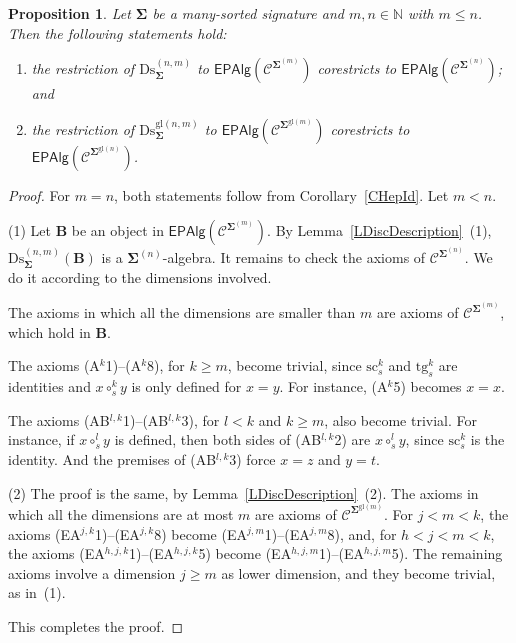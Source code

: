 \documentclass[a4paper, reqno
]{amsart}
\newcommand{\sig}[1]{\mathbf{#1}}             %
\newcommand{\spec}[1]{\boldsymbol{\mathcal{#1}}} %
\newcommand{\gl}{\mathrm{gl}}                %
\newcommand{\src}{\mathrm{sc}}
\newcommand{\tgt}{\mathrm{tg}}
\newcommand{\Ds}{\mathrm{Ds}}
\theoremstyle{plain}
\newtheorem{proposition}[theorem]{Proposition}
\theoremstyle{definition}
\begin{document}
\begin{proposition}\label{PDiscDerivor}
Let $\sig{\Sigma}$ be a many-sorted signature and $m,n\in\mathbb{N}$ with $m\leq n$.
Then the following statements hold:
\begin{enumerate}
\item the restriction of $\Ds^{(n,m)}_{\sig{\Sigma}}$ to $\mathsf{EPAlg}(\spec{C}^{\sig{\Sigma}^{(m)}})$ corestricts to $\mathsf{EPAlg}(\spec{C}^{\sig{\Sigma}^{(n)}})$; and
\item the restriction of $\Ds^{\gl(n,m)}_{\sig{\Sigma}}$ to $\mathsf{EPAlg}(\spec{C}^{\sig{\Sigma}^{\gl(m)}})$ corestricts to $\mathsf{EPAlg}(\spec{C}^{\sig{\Sigma}^{\gl(n)}})$.
\end{enumerate}
\end{proposition}
\begin{proof}
For $m=n$, both statements follow from Corollary~\ref{CHepId}.
Let $m<n$.

(1) Let $\mathbf{B}$ be an object in $\mathsf{EPAlg}(\spec{C}^{\sig{\Sigma}^{(m)}})$.
By Lemma~\ref{LDiscDescription}~(1), $\Ds^{(n,m)}_{\sig{\Sigma}}(\mathbf{B})$ is a $\sig{\Sigma}^{(n)}$-algebra.
It remains to check the axioms of $\spec{C}^{\sig{\Sigma}^{(n)}}$.
We do it according to the dimensions involved.

The axioms in which all the dimensions are smaller than $m$ are axioms of $\spec{C}^{\sig{\Sigma}^{(m)}}$, which hold in $\mathbf{B}$.

The axioms (A$^{k}$1)--(A$^{k}$8), for $k\geq m$, become trivial, since $\src^{k}_{s}$ and $\tgt^{k}_{s}$ are identities and $x\circ^{k}_{s}y$ is only defined for $x=y$.
For instance, (A$^{k}$5) becomes $x=x$.

The axioms (AB$^{l,k}$1)--(AB$^{l,k}$3), for $l<k$ and $k\geq m$, also become trivial.
For instance, if $x\circ^{l}_{s}y$ is defined, then both sides of (AB$^{l,k}$2) are $x\circ^{l}_{s}y$, since $\src^{k}_{s}$ is the identity.
And the premises of (AB$^{l,k}$3) force $x=z$ and $y=t$.

(2) The proof is the same, by Lemma~\ref{LDiscDescription}~(2).
The axioms in which all the dimensions are at most $m$ are axioms of $\spec{C}^{\sig{\Sigma}^{\gl(m)}}$.
For $j<m<k$, the axioms (EA$^{j,k}$1)--(EA$^{j,k}$8) become (EA$^{j,m}$1)--(EA$^{j,m}$8), and, for $h<j<m<k$, the axioms (EA$^{h,j,k}$1)--(EA$^{h,j,k}$5) become (EA$^{h,j,m}$1)--(EA$^{h,j,m}$5).
The remaining axioms involve a dimension $j\geq m$ as lower dimension, and they become trivial, as in~(1).

This completes the proof.
\end{proof}
\end{document}
